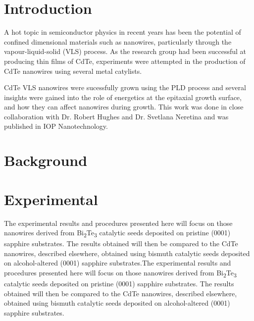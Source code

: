 \section{Introduction}
A hot topic in semiconductor physics in recent years has been the potential of confined dimensional materials such as nanowires, particularly through the vapour-liquid-solid (VLS) process. As the research group had been successful at producing thin films of CdTe, experiments were attempted in the production of CdTe nanowires using several metal catylists.

CdTe VLS nanowires were sucessfully grown using the PLD process and several insights were gained into the role of energetics at the epitaxial growth surface, and how they can affect nanowires during growth. This work was done in close collaboration with Dr. Robert Hughes and Dr. Svetlana Neretina and was published in IOP Nanotechnology\cite{Neretina2008b}.
\section{Background}

\section{Experimental}
The experimental results and procedures presented here will
focus on those nanowires derived from Bi\textsubscript{2}Te\textsubscript{3} catalytic seeds
deposited on pristine (0001) sapphire substrates. The results
obtained will then be compared to the CdTe nanowires,
described elsewhere\cite{Neretina2007b}, obtained using bismuth catalytic
seeds deposited on alcohol-altered (0001) sapphire substrates.The experimental results and procedures presented here will
focus on those nanowires derived from Bi\textsubscript{2}Te\textsubscript{3} catalytic seeds
deposited on pristine (0001) sapphire substrates. The results
obtained will then be compared to the CdTe nanowires,
described elsewhere\cite{Neretina2007b}, obtained using bismuth catalytic
seeds deposited on alcohol-altered (0001) sapphire substrates.

